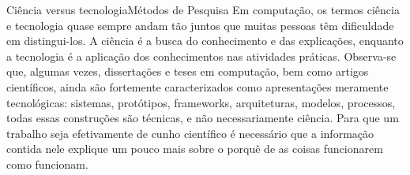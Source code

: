 \documentclass[t]{beamer}
\begin{document}

\begin{ftst}{Ciência versus tecnologia}{Métodos de Pesquisa}
\vone
\footnotesize
\justifying
Em computação, os termos ciência e tecnologia quase sempre andam tão juntos que muitas pessoas têm dificuldade em distingui-los. 
\vone
A ciência é a busca do conhecimento e das explicações, enquanto a tecnologia é a aplicação dos conhecimentos nas atividades práticas.
\vone
Observa-se que, algumas vezes, dissertações e teses em computação, bem como artigos científicos, ainda são fortemente caracterizados como apresentações meramente tecnológicas: sistemas, protótipos, frameworks, arquiteturas, modelos, processos, todas essas construções são técnicas, e não necessariamente
ciência.
\vone
Para que um trabalho seja efetivamente de cunho científico é necessário que a informação contida nele explique um pouco mais sobre o porquê de as coisas funcionarem como funcionam. 


\end{ftst}
\end{document}
